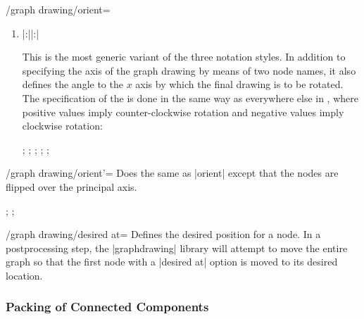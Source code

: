 \begin{key}{/graph drawing/orient=}
\begin{enumerate}
  \item {}|:||:| 

    This is the most generic variant of the three notation styles. In
    addition to specifying the axis of the graph drawing by means of two node names,
    it also defines the angle to the $x$ axis by which the final drawing 
    is to be rotated. The specification of the  is done in the
    same way as everywhere else in \tikzname, where positive values imply
    counter-clockwise rotation and negative values imply clockwise
    rotation:
\begin{codeexample}[]
\tikz {};
\tikz {};
\tikz {};
\tikz {};
\tikz {};
\end{codeexample}
  \end{enumerate}
\end{key}

\begin{key}{/graph drawing/orient'=}
  Does the same as |orient| except that the nodes are flipped over the
  principal axis.
\begin{codeexample}[]
\tikz {};
\tikz {};
\end{codeexample}
\end{key}


\begin{key}{/graph drawing/desired at=}
  Defines the desired position for a node. In a postprocessing step, the
  |graphdrawing| library will attempt to move the entire graph so that
  the first node with a |desired at| option is moved to its desired 
  location.
  \begin{codeexample}[]
  \end{codeexample}
\end{key}


\subsubsection{Packing of Connected Components}

